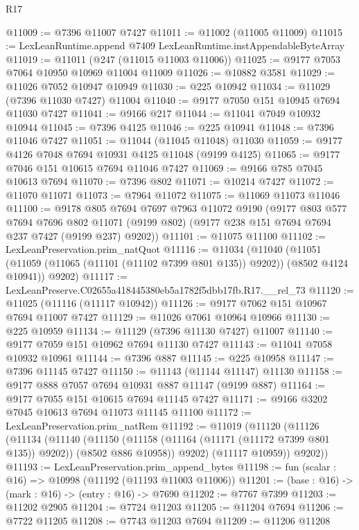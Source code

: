 \begin{lexlean}{R17}
\begin{coremodule}
@11009 := @7396 @11007 @7427
@11011 := @11002 (@11005 @11009)
@11015 := LexLeanRuntime.append @7409 LexLeanRuntime.instAppendableByteArray
@11019 := @11011 (@247 (@11015 @11003 @11006))
@11025 := @9177 @7053 @7064 @10950 @10969 @11004 @11009
@11026 := @10882 @3581
@11029 := @11026 @7052 @10947 @10949
@11030 := @225 @10942
@11034 := @11029 (@7396 @11030 @7427) @11004
@11040 := @9177 @7050 @151 @10945 @7694 @11030 @7427
@11041 := @9166 @217
@11044 := @11041 @7049 @10932 @10944
@11045 := @7396 @4125
@11046 := @225 @10941
@11048 := @7396 @11046 @7427
@11051 := @11044 (@11045 @11048) @11030
@11059 := @9177 @4126 @7048 @7694 @10931 @4125 @11048 (@9199 @4125)
@11065 := @9177 @7046 @151 @10615 @7694 @11046 @7427
@11069 := @9166 @785 @7045 @10613 @7694
@11070 := @7396 @802
@11071 := @10214 @7427
@11072 := @11070 @11071
@11073 := @7964 @11072
@11075 := @11069 @11073 @11046
@11100 := @9178
    @805
    @7694
    @7697
    @7963
    @11072
    @9190
    (@9177
      @803
      @577
      @7694
      @7696
      @802
      @11071
      (@9199 @802)
      (@9177 @238 @151 @7694 @7694 @237 @7427 (@9199 @237) @9202))
@11101 := @11075 @11100
@11102 := LexLeanPreservation.prim_natQuot
@11116 := @11034
    (@11040
      (@11051 (@11059 (@11065 (@11101 (@11102 @7399 @801 @135)) @9202)) (@8502 @4124 @10941))
      @9202)
@11117 := LexLeanPreserve.C02655a418445380eb5a1782f5dbb17fb.R17.__rel_73
@11120 := @11025 (@11116 (@11117 @10942))
@11126 := @9177 @7062 @151 @10967 @7694 @11007 @7427
@11129 := @11026 @7061 @10964 @10966
@11130 := @225 @10959
@11134 := @11129 (@7396 @11130 @7427) @11007
@11140 := @9177 @7059 @151 @10962 @7694 @11130 @7427
@11143 := @11041 @7058 @10932 @10961
@11144 := @7396 @887
@11145 := @225 @10958
@11147 := @7396 @11145 @7427
@11150 := @11143 (@11144 @11147) @11130
@11158 := @9177 @888 @7057 @7694 @10931 @887 @11147 (@9199 @887)
@11164 := @9177 @7055 @151 @10615 @7694 @11145 @7427
@11171 := @9166 @3202 @7045 @10613 @7694 @11073 @11145 @11100
@11172 := LexLeanPreservation.prim_natRem
@11192 := @11019
    (@11120
      (@11126
        (@11134
          (@11140
            (@11150 (@11158 (@11164 (@11171 (@11172 @7399 @801 @135)) @9202)) (@8502 @886 @10958))
            @9202)
          (@11117 @10959))
        @9202))
@11193 := LexLeanPreservation.prim_append_bytes
@11198 := fun (scalar : @16) => @10998 (@11192 (@11193 @11003 @11006))
@11201 := (base : @16) -> (mark : @16) -> (entry : @16) -> @7690
@11202 := @7767 @7399
@11203 := @11202 @2905
@11204 := @7724 @11203
@11205 := @11204 @7694
@11206 := @7722 @11205
@11208 := @7743 @11203 @7694
@11209 := @11206 @11208

\end{coremodule}
\end{lexlean}
